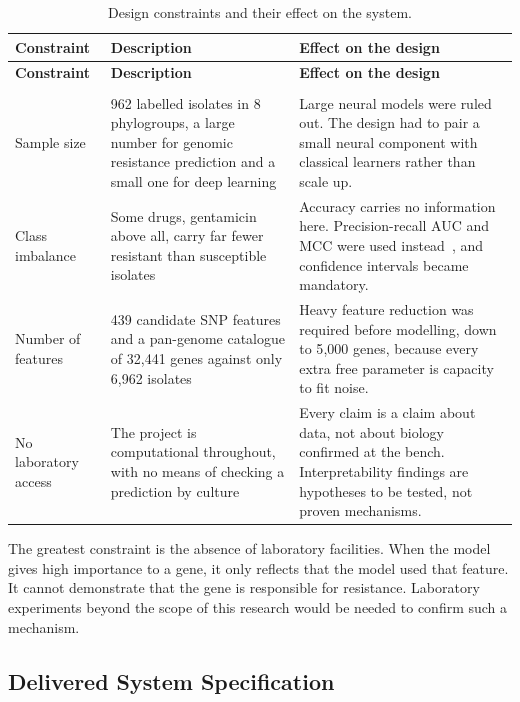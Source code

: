 {\small\setlength{\tabcolsep}{5pt}
\begin{longtable}{|>{\raggedright\arraybackslash}p{2.8cm}|>{\raggedright\arraybackslash}p{5.0cm}|>{\raggedright\arraybackslash}p{6.1cm}|}
\caption{Design constraints and their effect on the system.}
\label{tab:constraints}\\
\hline
\textbf{Constraint} & \textbf{Description} & \textbf{Effect on the design} \\
\hline
\endfirsthead
\hline
\textbf{Constraint} & \textbf{Description} & \textbf{Effect on the design} \\
\hline
\endhead
\hline
\multicolumn{3}{r}{\footnotesize\textit{Continued on the next page}}\\
\endfoot
\hline
\endlastfoot
Sample size & 6{,}962 labelled isolates in 8 phylogroups, a large number for genomic resistance
prediction and a small one for deep learning~\cite{goodfellow2016dl} &
Large neural models were ruled out. The design had to pair a small neural component with
classical learners rather than scale up. \\
\hline
Class imbalance & Some drugs, gentamicin above all, carry far fewer resistant than susceptible
isolates &
Accuracy carries no information here. Precision-recall AUC and MCC were used
instead~\cite{saito2015}, and confidence intervals became mandatory. \\
\hline
Number of features & 535{,}439 candidate SNP features and a pan-genome catalogue of 32{,}441
genes against only 6{,}962 isolates &
Heavy feature reduction was required before modelling, down to 5{,}000 genes, because every
extra free parameter is capacity to fit noise. \\
\hline
No laboratory access & The project is computational throughout, with no means of checking a
prediction by culture &
Every claim is a claim about data, not about biology confirmed at the bench. Interpretability
findings are hypotheses to be tested, not proven mechanisms. \\
\end{longtable}}

The greatest constraint is the absence of laboratory facilities. When the model gives high
importance to a gene, it only reflects that the model used that feature. It cannot demonstrate
that the gene is responsible for resistance. Laboratory experiments beyond the scope of this
research would be needed to confirm such a mechanism.

\subsection{Delivered System Specification}


